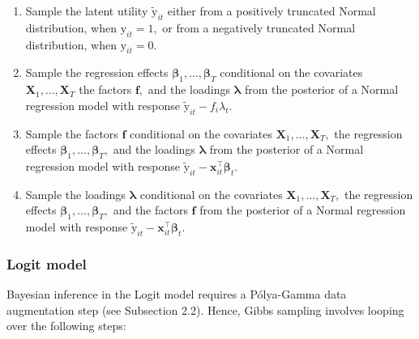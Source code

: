 \documentclass[a4paper, preprint, 3p,
authoryear]{elsarticle} %
\begin{document}
\begin{enumerate}
   \item Sample the latent utility $\tilde{\text{y}}_{it}$ either from a positively truncated Normal distribution, when $\text{y}_{it} = 1,$ or from a negatively truncated Normal distribution, when $\text{y}_{it} = 0.$
    \item Sample the regression effects $\boldsymbol{\beta}_1,\dots,\boldsymbol{\beta}_T$ conditional on the covariates $\textbf{X}_1,\dots,\textbf{X}_T$ the factors $\mathbf{f},$ and the loadings $\boldsymbol{\lambda}$ from the posterior of a Normal regression model with response $\tilde{\text{y}}_{it}-f_i\lambda_t.$
    \item Sample the factors $\mathbf{f}$ conditional on the covariates $\textbf{X}_1,\dots,\textbf{X}_T,$ the regression effects $\boldsymbol{\beta}_1,\dots,\boldsymbol{\beta}_T,$ and the loadings $\boldsymbol{\lambda}$  from the posterior of a Normal regression model with response  $\tilde{\text{y}}_{it}-\textbf{x}_{it}^\top \boldsymbol{\beta}_t$.
    \item Sample the loadings $\boldsymbol{\lambda}$ conditional on the covariates $\textbf{X}_1,\dots,\textbf{X}_T,$ the regression effects $\boldsymbol{\beta}_1,\dots,\boldsymbol{\beta}_T,$ and the factors $\mathbf{f}$ from the posterior of a Normal regression model with response  $\tilde{\text{y}}_{it}-\textbf{x}_{it}^\top \boldsymbol{\beta}_t.$
\end{enumerate}

\subsubsection{Logit model}\label{logit-model}

Bayesian inference in the Logit model requires a Pólya-Gamma data
augmentation step (see Subsection 2.2). Hence, Gibbs sampling involves
looping over the following steps:
\end{document}
